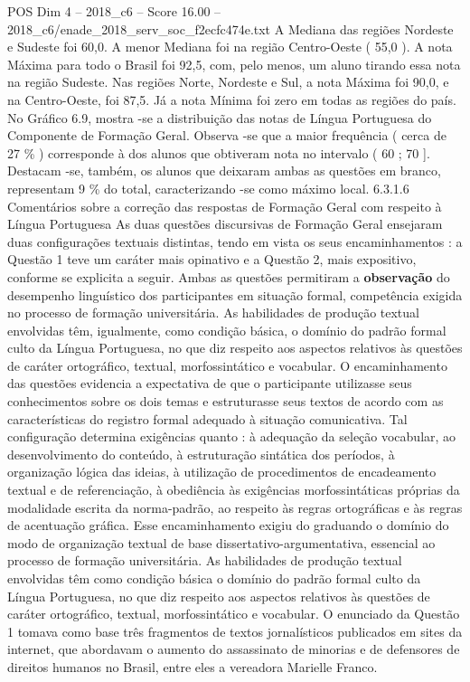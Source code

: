 \begin{textsample}{POS Dim 4 – 2018\_c6 – Score 16.00 – 2018\_c6/enade\_2018\_serv\_soc\_f2ecfc474e.txt}
A Mediana das regiões Nordeste e Sudeste foi 60,0.
A menor Mediana foi na região Centro-Oeste ( 55,0 ).
A nota Máxima para todo o Brasil foi 92,5, com, pelo menos, um aluno tirando essa nota na região Sudeste.
Nas regiões Norte, Nordeste e Sul, a nota Máxima foi 90,0, e na Centro-Oeste, foi 87,5.
Já a nota Mínima foi zero em todas as regiões do país.
No Gráfico 6.9, mostra -se a distribuição das notas de Língua Portuguesa do Componente de Formação Geral.
Observa -se que a maior frequência ( cerca de 27 \% ) corresponde à dos alunos que obtiveram nota no intervalo ( 60 ; 70 ].
Destacam -se, também, os alunos que deixaram ambas as questões em branco, representam 9 \% do total, caracterizando -se como máximo local. 6.3.1.6 Comentários sobre a correção das respostas de Formação Geral com respeito à Língua Portuguesa As duas questões discursivas de Formação Geral ensejaram duas configurações textuais distintas, tendo em vista os seus encaminhamentos : a Questão 1 teve um caráter mais opinativo e a Questão 2, mais expositivo, conforme se explicita a seguir.
Ambas as questões permitiram a \textbf{observação} do desempenho linguístico dos participantes em situação formal, competência exigida no processo de formação universitária.
As habilidades de produção textual envolvidas têm, igualmente, como condição básica, o domínio do padrão formal culto da Língua Portuguesa, no que diz respeito aos aspectos relativos às questões de caráter ortográfico, textual, morfossintático e vocabular.
O encaminhamento das questões evidencia a expectativa de que o participante utilizasse seus conhecimentos sobre os dois temas e estruturasse seus textos de acordo com as características do registro formal adequado à situação comunicativa.
Tal configuração determina exigências quanto : à adequação da seleção vocabular, ao desenvolvimento do conteúdo, à estruturação sintática dos períodos, à organização lógica das ideias, à utilização de procedimentos de encadeamento textual e de referenciação, à obediência às exigências morfossintáticas próprias da modalidade escrita da norma-padrão, ao respeito às regras ortográficas e às regras de acentuação gráfica.
Esse encaminhamento exigiu do graduando o domínio do modo de organização textual de base dissertativo-argumentativa, essencial ao processo de formação universitária.
As habilidades de produção textual envolvidas têm como condição básica o domínio do padrão formal culto da Língua Portuguesa, no que diz respeito aos aspectos relativos às questões de caráter ortográfico, textual, morfossintático e vocabular.
O enunciado da Questão 1 tomava como base três fragmentos de textos jornalísticos publicados em sites da internet, que abordavam o aumento do assassinato de minorias e de defensores de direitos humanos no Brasil, entre eles a vereadora Marielle Franco.

\end{textsample}
